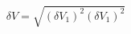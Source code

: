 \begin{equation}
\label{eq:delta_V_Malus}
\delta V = \sqrt{ (\delta V_1)^2 (\delta V_1)^2}
\end{equation}
